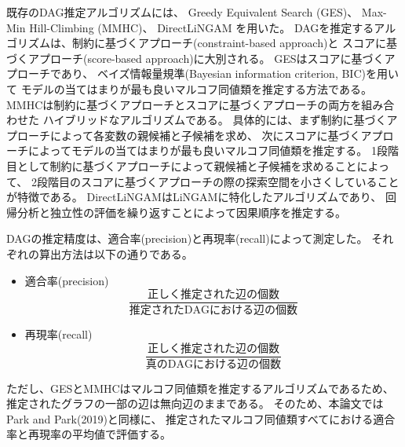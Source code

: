 既存のDAG推定アルゴリズムには、
Greedy Equivalent Search (GES)\cite{Chickering2002-iq}、
Max-Min Hill-Climbing (MMHC)\cite{Tsamardinos2006-qe}、
DirectLiNGAM\cite{Shimizu2011-pd}
を用いた。
DAGを推定するアルゴリズムは、制約に基づくアプローチ(constraint-based approach)と
スコアに基づくアプローチ(score-based approach)に大別される。
GESはスコアに基づくアプローチであり、
ベイズ情報量規準(Bayesian information criterion, BIC)を用いて
モデルの当てはまりが最も良いマルコフ同値類を推定する方法である。
MMHCは制約に基づくアプローチとスコアに基づくアプローチの両方を組み合わせた
ハイブリッドなアルゴリズムである。
具体的には、まず制約に基づくアプローチによって各変数の親候補と子候補を求め、
次にスコアに基づくアプローチによってモデルの当てはまりが最も良いマルコフ同値類を推定する。
1段階目として制約に基づくアプローチによって親候補と子候補を求めることによって、
2段階目のスコアに基づくアプローチの際の探索空間を小さくしていることが特徴である。
DirectLiNGAMはLiNGAM\cite{Shimizu2006-yu}に特化したアルゴリズムであり、
回帰分析と独立性の評価を繰り返すことによって因果順序を推定する。

DAGの推定精度は、適合率(precision)と再現率(recall)によって測定した。
それぞれの算出方法は以下の通りである。
\begin{itemize}
  \item 適合率(precision)
  \begin{equation*}
    \frac{\text{正しく推定された辺の個数}}{\text{推定されたDAGにおける辺の個数}}
  \end{equation*}

  \item 再現率(recall)
  \begin{equation*}
    \frac{\text{正しく推定された辺の個数}}{\text{真のDAGにおける辺の個数}}
  \end{equation*}
\end{itemize}
ただし、GESとMMHCはマルコフ同値類を推定するアルゴリズムであるため、
推定されたグラフの一部の辺は無向辺のままである。
そのため、本論文ではPark and Park(2019)\cite{Park2019-qy}と同様に、
推定されたマルコフ同値類すべてにおける適合率と再現率の平均値で評価する。

